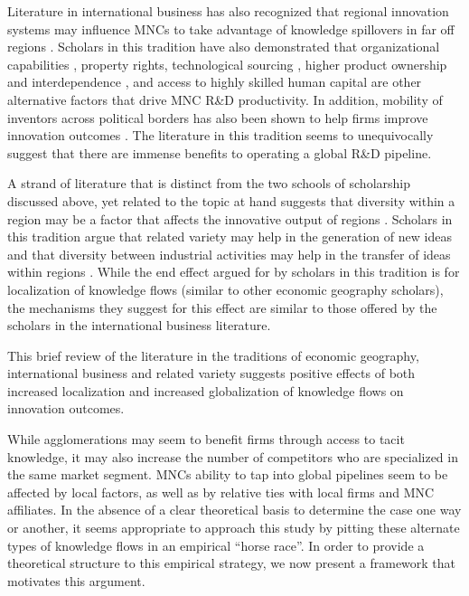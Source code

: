 \documentclass[12pt,letterpaper]{article}
\begin{document}
Literature in international business has also recognized that regional innovation systems may influence MNCs to take advantage of knowledge spillovers in far off regions \citep{Andersen2005}. Scholars in this tradition have also demonstrated that organizational capabilities \citep{Zhao2006}, property rights, technological sourcing \citep{Florida1997}, higher product ownership and interdependence \citep{Pearce1999}, and access to highly skilled human capital are other alternative factors that drive MNC R\&D productivity. In addition, mobility of inventors across political borders has also been shown to help firms improve innovation outcomes \citep*{Alnuaimi2012b}. The literature in this tradition seems to unequivocally suggest that there are immense benefits to operating a global R\&D pipeline.

A strand of literature that is distinct from the two schools of scholarship discussed above, yet related to the topic at hand  suggests that diversity within a region may be a factor that affects the innovative output of regions \citep{Feldman1999}. Scholars in this tradition argue that related variety \citep*{Boschma2009, Frenken2007} may help in the generation of new ideas and that diversity between industrial activities may help in the transfer of ideas within regions \citep{Jacobs1969}. While the end effect argued for by scholars in this tradition is for localization of knowledge flows (similar to other economic geography scholars), the mechanisms they suggest for this effect are similar to those offered by the scholars in the international business literature. 

This brief review of the literature in the traditions of economic geography, international business and related variety suggests positive effects of both increased localization and increased globalization of knowledge flows on innovation outcomes.  \par

While agglomerations may seem to benefit firms through access to tacit knowledge, it may also increase the number of competitors who are specialized in the same market segment. MNCs ability to tap into global pipelines \citep*{Bathelt2004} seem to be affected by local factors, as well as by relative ties with local firms and MNC affiliates. In the absence of a clear theoretical basis to determine the case one way or another, it seems appropriate  to approach this study by pitting these alternate types of knowledge flows in an empirical ``horse race''. In order to provide a theoretical structure to this empirical strategy, we now present a framework that motivates this argument.  
\end{document}
